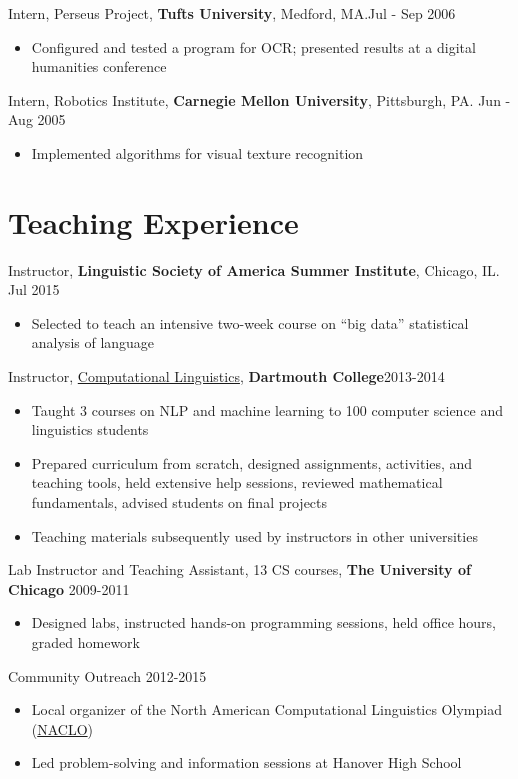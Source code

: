 \documentclass{res}
\begin{document}
\begin{resume}
Intern, Perseus Project, {\bf Tufts University}, Medford, MA.\hfill Jul - Sep 2006
\begin{itemize}[noitemsep]
\item Configured and tested a program for OCR; presented results at a digital humanities conference
\end{itemize}

Intern, Robotics Institute, {\bf Carnegie Mellon University}, Pittsburgh, PA. \hfill Jun - Aug 2005
\begin{itemize}[noitemsep]
\item Implemented algorithms for visual texture recognition 
\end{itemize}


\section{Teaching Experience}
 
 Instructor, {\bf Linguistic Society of America Summer Institute}, Chicago, IL. \hfill Jul 2015
 \begin{itemize}[noitemsep]
 \item Selected to teach an intensive two-week course on ``big data'' statistical analysis of language  
 \end{itemize}
 
Instructor, \href{http://www.cs.dartmouth.edu/~sravana/classes/f14compling/}{Computational Linguistics}, {\bf Dartmouth College}\hfill 2013-2014
\begin{itemize}[noitemsep]
\item Taught 3 courses on NLP and machine learning to 100 computer science and linguistics students
\item Prepared curriculum from scratch, designed assignments, activities, and teaching tools, held extensive help sessions, reviewed mathematical fundamentals, advised students on final projects
\item Teaching materials subsequently used by instructors in other universities
\end{itemize}

Lab Instructor and Teaching Assistant, 13 CS courses, {\bf The University of Chicago} \hfill 2009-2011
 \begin{itemize}[noitemsep]
\item Designed labs, instructed hands-on programming sessions, held office hours, graded homework
\end{itemize}

Community Outreach  \hfill 2012-2015
 \begin{itemize}[noitemsep]
\item Local organizer of the North American Computational Linguistics Olympiad (\href{http://www.cs.dartmouth.edu/~naclo/}{NACLO}) 
\item Led problem-solving and information sessions at Hanover High School
\end{itemize}


\end{resume}
\end{document}
